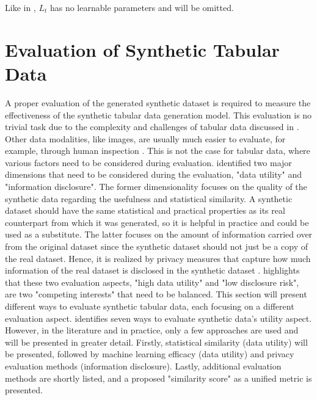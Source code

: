 Like in \cite{ho2020DenoisingDiffusionProbabilistic}, $L_{t}$ has no learnable parameters and will be omitted.

\section{Evaluation of Synthetic Tabular Data}
\label{ch:preliminaries-evaluationOfSyntheticTabularData}

A proper evaluation of the generated synthetic dataset is required to measure the effectiveness of the synthetic tabular data generation model.
This evaluation is no trivial task due to the complexity and challenges of tabular data discussed in .
Other data modalities, like images, are usually much easier to evaluate, for example, through human inspection \cite{chundawat2022UniversalMetricRobust}. 
This is not the case for tabular data, where various factors need to be considered during evaluation.
\textcite[p. 6]{goncalves2020GenerationEvaluationSynthetic} identified two major dimensions that need to be considered during the evaluation, "data utility" and "information disclosure".
The former dimensionality focuses on the quality of the synthetic data regarding the usefulness and statistical similarity.
A synthetic dataset should have the same statistical and practical properties as its real counterpart from which it was generated, so it is helpful in practice and could be used as a substitute.
The latter focuses on the amount of information carried over from the original dataset since the synthetic dataset should not just be a copy of the real dataset.
Hence, it is realized by privacy measures that capture how much information of the real dataset is disclosed in the synthetic dataset \cite{goncalves2020GenerationEvaluationSynthetic}.
\textcite[p. 2]{little2021GenerativeAdversarialNetworksa} highlights that these two evaluation aspects, "high data utility" and "low disclosure risk", are two "competing interests" that need to be balanced.
This section will present different ways to evaluate synthetic tabular data, each focusing on a different evaluation aspect.
\cite{elemam2020SevenWaysEvaluate} identifies seven ways to evaluate synthetic data's utility aspect.
However, in the literature and in practice, only a few approaches are used and will be presented in greater detail.
Firstly, statistical similarity (data utility) will be presented, followed by machine learning efficacy (data utility) and privacy evaluation methods (information disclosure).
Lastly, additional evaluation methods are shortly listed, and a proposed "similarity score" as a unified metric is presented.


